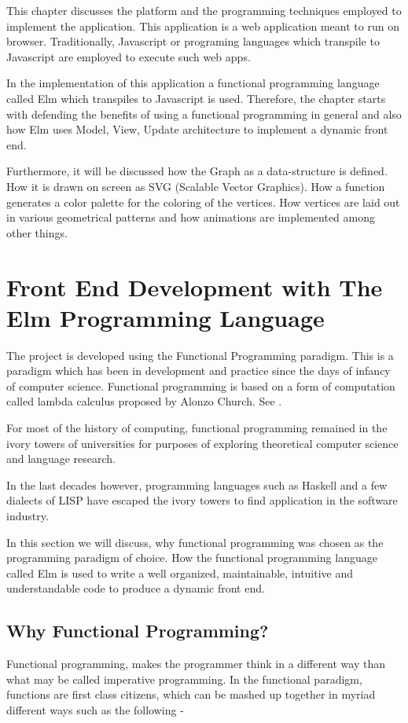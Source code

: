 \graphicspath{ {images/} }

This chapter discusses the platform and the programming techniques employed to
implement the application.  This application is a web application meant to run
on browser. Traditionally, Javascript or programing languages which transpile
to Javascript are employed to execute such web apps. 

In the implementation of this application a functional programming language
called Elm which transpiles to Javascript is used. Therefore, the chapter
starts with defending the benefits of using a functional programming in general
and also how Elm uses Model, View, Update architecture to implement a dynamic
front end.

Furthermore, it will be discussed how the Graph as a data-structure is defined. How
it is drawn on screen as SVG (Scalable Vector Graphics). How a function
generates a color palette for the coloring of the vertices. How vertices are
laid out in various geometrical patterns and how animations are implemented
among other things.


\section{Front End Development with The Elm Programming Language}

The project is developed using the Functional Programming paradigm. This is a
paradigm which has been in development and practice since the days of infancy
of computer science. Functional programming is based on a form of computation
called lambda calculus proposed by Alonzo Church. See \cite{Hudak2007}.

For most of the history of computing, functional programming remained in the
ivory towers of universities for purposes of exploring theoretical computer
science and language research.

In the last decades however, programming languages such as Haskell and a few
dialects of LISP have escaped the ivory towers to find application in the
software industry.

In this section we will discuss, why functional programming was chosen as the
programming paradigm of choice. How the functional programming language called
Elm is used to write a well organized, maintainable, intuitive and
understandable code to produce a dynamic front end.

\subsection{Why Functional Programming?}
Functional programming, makes the programmer think in a different way than what
may be called imperative programming. In the functional paradigm, functions are
first class citizens, which can be mashed up together in myriad different ways
such as the following -


